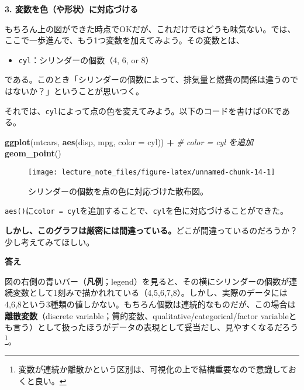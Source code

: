 \documentclass[]{book}
\newenvironment{Shaded}{\begin{snugshade}}{\end{snugshade}}
\newcommand{\KeywordTok}[1]{\textcolor[rgb]{0.13,0.29,0.53}{\textbf{#1}}}
\newcommand{\DataTypeTok}[1]{\textcolor[rgb]{0.13,0.29,0.53}{#1}}
\newcommand{\StringTok}[1]{\textcolor[rgb]{0.31,0.60,0.02}{#1}}
\newcommand{\CommentTok}[1]{\textcolor[rgb]{0.56,0.35,0.01}{\textit{#1}}}
\newcommand{\OperatorTok}[1]{\textcolor[rgb]{0.81,0.36,0.00}{\textbf{#1}}}
\newcommand{\NormalTok}[1]{#1}
\providecommand{\tightlist}{%
  \setlength{\itemsep}{0pt}\setlength{\parskip}{0pt}}
\let\rmarkdownfootnote\footnote%
\def\footnote{\protect\rmarkdownfootnote}
\begin{document}
\textbf{3. 変数を色（や形状）に対応づける}

もちろん上の図ができた時点でOKだが、これだけではどうも味気ない。では、ここで一歩進んで、もう1つ変数を加えてみよう。その変数とは、

\begin{itemize}
\tightlist
\item
  \texttt{cyl}：シリンダーの個数（4, 6, or 8）
\end{itemize}

である。このとき「シリンダーの個数によって、排気量と燃費の関係は違うのではないか？」ということが思いつく。

それでは、\texttt{cyl}によって点の色を変えてみよう。以下のコードを書けばOKである。



\begin{Shaded}
\begin{Highlighting}[]
\KeywordTok{ggplot}\NormalTok{(mtcars, }\KeywordTok{aes}\NormalTok{(disp, mpg, }\DataTypeTok{color =}\NormalTok{ cyl)) }\OperatorTok{+}\StringTok{ }\CommentTok{# color = cyl を追加}
\StringTok{  }\KeywordTok{geom_point}\NormalTok{()}
\end{Highlighting}
\end{Shaded}

\begin{figure}

{\centering \texttt{[image: lecture\_note\_files/figure-latex/unnamed-chunk-14-1]} 

}

\caption{シリンダーの個数を点の色に対応づけた散布図。}\label{fig:unnamed-chunk-14}
\end{figure}

\texttt{aes()}に\texttt{color\ =\ cyl}を追加することで、\texttt{cyl}を色に対応づけることができた。

\textbf{しかし、このグラフは厳密には間違っている。}どこが間違っているのだろうか？　少し考えてみてほしい。

\textbf{答え}

図の右側の青いバー（\textbf{凡例}；legend）を見ると、その横にシリンダーの個数が連続変数として1刻みで描かれれている（4,5,6,7,8）。しかし、実際のデータには4,6,8という3種類の値しかない。もちろん個数は連続的なものだが、この場合は\textbf{離散変数}（discrete
variable；質的変数、qualitative/categorical/factor
variableとも言う）として扱ったほうがデータの表現として妥当だし、見やすくなるだろう\footnote{変数が連続か離散かという区別は、可視化の上で結構重要なので意識しておくと良い。}。
\end{document}
